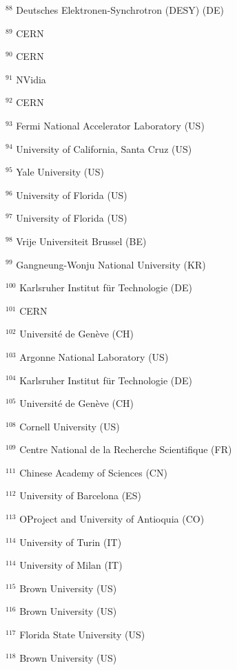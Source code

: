 \par {\footnotesize $^{88}$ Deutsches Elektronen-Synchrotron (DESY) (DE)}
\par {\footnotesize $^{89}$ CERN}
\par {\footnotesize $^{90}$ CERN}
\par {\footnotesize $^{91}$ NVidia}
\par {\footnotesize $^{92}$ CERN}
\par {\footnotesize $^{93}$ Fermi National Accelerator Laboratory (US)}
\par {\footnotesize $^{94}$ University of California, Santa Cruz (US)}
\par {\footnotesize $^{95}$ Yale University (US)}
\par {\footnotesize $^{96}$ University of Florida (US)}
\par {\footnotesize $^{97}$ University of Florida (US)}
\par {\footnotesize $^{98}$ Vrije Universiteit Brussel (BE)}
\par {\footnotesize $^{99}$ Gangneung-Wonju National University (KR)}
\par {\footnotesize $^{100}$ Karlsruher Institut f{\"u}r Technologie (DE)}
\par {\footnotesize $^{101}$ CERN}
\par {\footnotesize $^{102}$ Universit{\'e} de Gen{\`e}ve (CH)}
\par {\footnotesize $^{103}$ Argonne National Laboratory (US)}
\par {\footnotesize $^{104}$ Karlsruher Institut f{\"u}r Technologie (DE)}
\par {\footnotesize $^{105}$ Universit{\'e} de Gen{\`e}ve (CH)}
\par {\footnotesize $^{108}$ Cornell University (US)}
\par {\footnotesize $^{109}$ Centre National de la Recherche Scientifique (FR)}
\par {\footnotesize $^{111}$ Chinese Academy of Sciences (CN)}
\par {\footnotesize $^{112}$ University of Barcelona (ES)}
\par {\footnotesize $^{113}$ OProject and University of Antioquia (CO)}
\par {\footnotesize $^{114}$ University of Turin (IT)}
\par {\footnotesize $^{114}$ University of Milan (IT)}
\par {\footnotesize $^{115}$ Brown University (US)}
\par {\footnotesize $^{116}$ Brown University (US)}
\par {\footnotesize $^{117}$ Florida State University (US)}
\par {\footnotesize $^{118}$ Brown University (US)}

\clearpage
\makeatother
